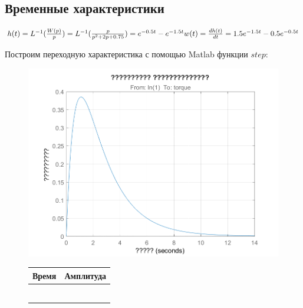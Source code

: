 \documentclass[14pt,a4paper,report]{report}
\begin{document}
\subsection{Временные характеристики}

$
\\
h(t)=L^{-1}(\frac{W(p)}{p})=L^{-1}(\frac{p}{p^2+2p+0.75})= e^{-0.5t} - e^{-1.5t}\\
w(t)=\frac{dh(t)}{dt}=1.5e^{-1.5t} - 0.5e^{-0.5t}\\
$

\newpage
Построим переходную характеристика с помощью Matlab функции $step$:

\begin{figure}[htb]
	\begin{minipage}[c]{0.58\textwidth}
		\includegraphics[width=\textwidth]{images/step.png}
	\end{minipage}
	\centering
	\begin{minipage}[c]{0.38\textwidth}
		\centering
		\vspace{0pt}
		\begin{tabular}[b]{cc}\hline
			Время & Амплитуда \\ \hline
			&  \\
			&  \\
			&  \\
			&  \\
			&  \\
			&  \\ \hline
		\end{tabular}
	\end{minipage}
	
	\label{fig:sor-v}
\end{figure}
\end{document}
